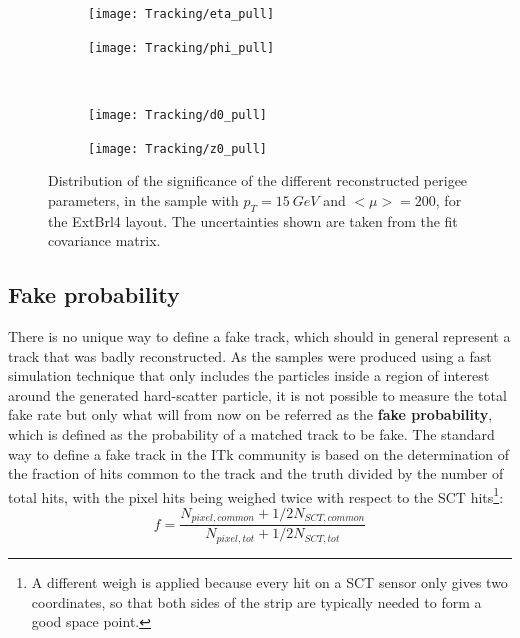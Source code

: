 \documentclass[a4paper,twoside,12pt]{article}
\begin{document}
\begin{figure}
\begin{subfigure}{.5\linewidth}
\texttt{[image: Tracking/eta\_pull]}
\caption{}
\label{fig:tracking:eta_pull}
\end{subfigure}
\begin{subfigure}{.5\linewidth}
\texttt{[image: Tracking/phi\_pull]}
\caption{}
\label{fig:tracking:phi_pull}
\end{subfigure}\\[1ex]
\begin{subfigure}{.5\linewidth}
\texttt{[image: Tracking/d0\_pull]}
\caption{}
\label{fig:tracking:d0_pull}
\end{subfigure}
\begin{subfigure}{.5\linewidth}
\texttt{[image: Tracking/z0\_pull]}
\caption{}
\label{fig:tracking:z0_pull}
\end{subfigure}

\caption{Distribution of the significance of the different reconstructed perigee parameters, in the sample with $p_{T} = 15\ GeV$ and $<\mu> = 200$, for the ExtBrl4 layout. The
uncertainties shown are taken from the fit covariance matrix.}
\label{fig:tracking:pull}
\end{figure}

\subsection{Fake probability}
There is no unique way to define a fake track, which should in general represent a track that was badly reconstructed. As the samples were produced using a fast simulation technique that
only includes the particles inside a region of interest around the generated hard-scatter particle, it is not possible to measure the total fake rate but only what will from now on be referred
as the \textbf{fake probability}, which is defined as the probability of a matched track to be fake. The standard way to define a fake track in the ITk community is based on the determination of the fraction of hits common to the track and the truth divided by the number of total hits, with the pixel hits being weighed twice with respect to the SCT hits\footnote{A different weigh is applied because every hit on a SCT sensor only gives two coordinates, so that both sides of the strip are typically needed to form a good space point.}: \\
$$
f = \frac{N_{pixel, common} + 1/2 N_{SCT, common}}{N_{pixel, tot} + 1/2 N_{SCT, tot}}
$$
\end{document}
